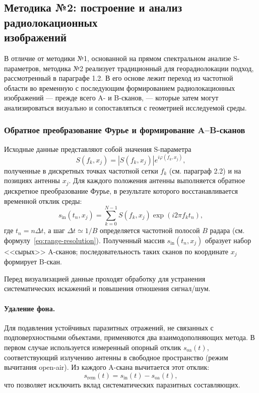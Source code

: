 \subsection[Методика №2: построение и анализ радиолокационных изображений]{\texorpdfstring{Методика №2: построение и анализ радиолокационных\\изображений}{Методика №2: построение и анализ радиолокационных изображений}}
\label{sec:radar-images-method}

В отличие от методики №1, основанной на прямом спектральном анализе S-параметров, методика №2 реализует традиционный для георадиолокации подход, рассмотренный в параграфе 1.2. В его основе лежит переход из частотной области во временную с последующим формированием радиолокационных изображений --- прежде всего A- и B-сканов, --- которые затем могут анализироваться визуально и сопоставляться с геометрией исследуемой среды.

\subsubsection{Обратное преобразование Фурье и формирование A--B-сканов}

Исходные данные представляют собой значения S-параметра
\begin{equation}
    S(f_k, x_j) = |S(f_k, x_j)| e^{i\varphi(f_k, x_j)},
\end{equation}
полученные в дискретных точках частотной сетки $f_k$ (см. параграф 2.2) и на позициях антенны $x_j$. Для каждого положения антенны выполняется обратное дискретное преобразование Фурье, в результате которого восстанавливается временной отклик среды:
\begin{equation}
    s_{\mathrm{in}}(t_n, x_j)
    = \sum_{k=0}^{N-1} S(f_k, x_j)\exp(i2\pi f_k t_n),
\end{equation}
где $t_n = n\Delta t$, а шаг $\Delta t \simeq 1/B$ определяется частотной полосой $B$ радара (см. формулу~\eqref{eq:range-resolution}). Полученный массив $s_{\mathrm{in}}(t_n, x_j)$ образует набор <<сырых>> A-сканов; последовательность таких сканов по координате $x_j$ формирует B-скан.

Перед визуализацией данные проходят обработку для устранения систематических искажений и повышения отношения сигнал/шум.

\paragraph{Удаление фона.}
Для подавления устойчивых паразитных отражений, не связанных с подповерхностными объектами, применяются два взаимодополняющих метода. В первом случае используется измеренный опорный отклик $s_{\mathrm{oa}}(t)$, соответствующий излучению антенны в свободное пространство (режим вычитания open-air). Из каждого A-скана вычитается этот отклик:
\begin{equation}
    s_{\mathrm{rem}}(t) = s_{\mathrm{in}}(t) - s_{\mathrm{oa}}(t),
\end{equation}
что позволяет исключить вклад систематических паразитных составляющих.

